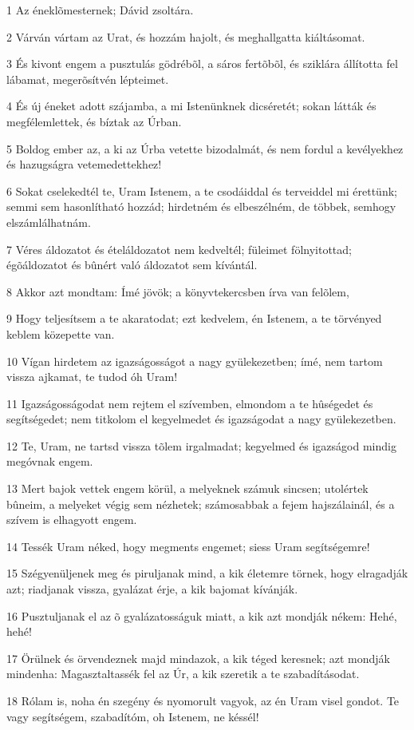 \par 1 Az éneklõmesternek; Dávid zsoltára.
\par 2 Várván vártam az Urat, és hozzám hajolt, és meghallgatta kiáltásomat.
\par 3 És kivont engem a pusztulás gödrébõl, a sáros fertõbõl, és sziklára állította fel lábamat, megerõsítvén lépteimet.
\par 4 És új éneket adott szájamba, a mi Istenünknek dicséretét; sokan látták és megfélemlettek, és bíztak az Úrban.
\par 5 Boldog ember az, a ki az Úrba vetette bizodalmát, és nem fordul a kevélyekhez és hazugságra vetemedettekhez!
\par 6 Sokat cselekedtél te, Uram Istenem, a te csodáiddal és terveiddel mi érettünk; semmi sem hasonlítható hozzád; hirdetném és elbeszélném, de többek, semhogy elszámlálhatnám.
\par 7 Véres áldozatot és ételáldozatot nem kedveltél; füleimet fölnyitottad; égõáldozatot és bûnért való áldozatot sem kívántál.
\par 8 Akkor azt mondtam: Ímé jövök; a könyvtekercsben írva van felõlem,
\par 9 Hogy teljesítsem a te akaratodat; ezt kedvelem, én Istenem, a te törvényed keblem közepette van.
\par 10 Vígan hirdetem az igazságosságot a nagy gyülekezetben; ímé, nem tartom vissza ajkamat, te tudod óh Uram!
\par 11 Igazságosságodat nem rejtem el szívemben, elmondom a te hûségedet és segítségedet; nem titkolom el kegyelmedet és igazságodat a nagy gyülekezetben.
\par 12 Te, Uram, ne tartsd vissza tõlem irgalmadat; kegyelmed és igazságod mindig megóvnak engem.
\par 13 Mert bajok vettek engem körül, a melyeknek számuk sincsen; utolértek bûneim, a melyeket végig sem nézhetek; számosabbak a fejem hajszálainál, és a szívem is elhagyott engem.
\par 14 Tessék Uram néked, hogy megments engemet; siess Uram segítségemre!
\par 15 Szégyenüljenek meg és piruljanak mind, a kik életemre törnek, hogy elragadják azt; riadjanak vissza, gyalázat érje, a kik bajomat kívánják.
\par 16 Pusztuljanak el az õ gyalázatosságuk miatt, a kik azt mondják nékem: Hehé, hehé!
\par 17 Örülnek és örvendeznek majd mindazok, a kik téged keresnek; azt mondják mindenha: Magasztaltassék fel az Úr, a kik szeretik a te szabadításodat.
\par 18 Rólam is, noha én szegény és nyomorult vagyok, az én Uram visel gondot. Te vagy segítségem, szabadítóm, oh Istenem, ne késsél!

